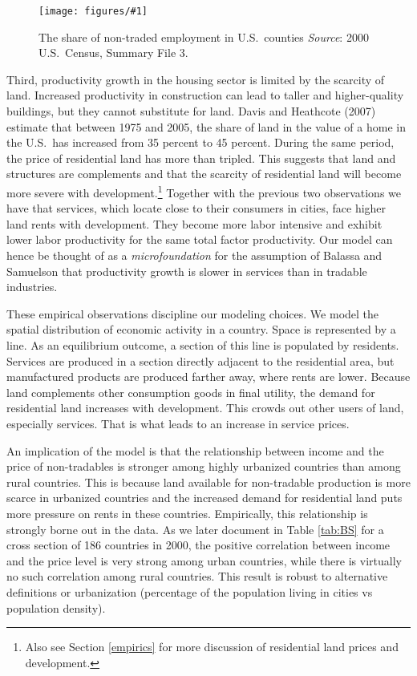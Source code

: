 \documentclass[12pt]{article}
\newcommand{\dofigure}[2]{\begin{figure}
\begin{centering}
\texttt{[image: figures/\#1]}
  \caption{#2\label{fig:#1}}
\end{centering}
\end{figure}}
\begin{document}
\dofigure{ntcounties}{The share of non-traded employment in U.S.~counties\newline
\small\emph{Source}: 2000 U.S.~Census, Summary File 3.}

Third, productivity growth in the housing sector is limited by the scarcity of land. Increased productivity in construction can lead to taller and higher-quality buildings, but they cannot substitute for land. Davis and Heathcote (2007) estimate that between 1975 and 2005, the share of land in the value of a home in the U.S.~has increased from 35 percent to 45 percent. During the same period, the price of residential land has more than tripled. This suggests that land and structures are complements and that the scarcity of residential land will become more severe with development.\footnote{Also see Section \ref{empirics} for more discussion of residential land prices and development.}
Together with the previous two observations we have that services, which locate close to their consumers in cities, face higher land rents with development. They become more labor intensive and exhibit lower labor productivity  for the same total factor productivity. Our model can hence be thought of as a \emph{microfoundation} for the assumption of Balassa and Samuelson that productivity growth is slower in services than in tradable industries. 

These empirical observations discipline our modeling choices. We model the spatial distribution of economic activity in a country. Space is represented by a line. As an equilibrium outcome, a section of this line is populated by residents. Services are produced in a section directly adjacent to the residential area, but manufactured products are produced farther away, where rents are lower. Because land complements other consumption goods in final utility, the demand for residential land increases with development. This crowds out other users of land, especially services. That is what leads to an increase in service prices.

An implication of the model is that the relationship between income and the price of non-tradables is stronger among highly urbanized countries than among rural countries. This is because land available for non-tradable production is more scarce in urbanized countries and the increased demand for residential land puts more pressure on rents in these countries. Empirically, this relationship is strongly borne out in the data. As we later document in Table \ref{tab:BS} for a cross section of 186 countries in 2000, the positive correlation between income and the price level is very strong among urban countries, while there is virtually no such correlation among rural countries. This result is robust to alternative definitions or urbanization (percentage of the population living in cities vs population density).
\end{document}
